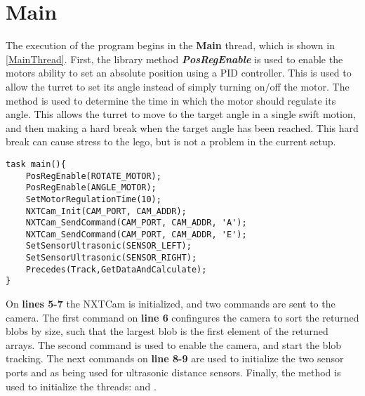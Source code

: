 \section{Main}
The execution of the program begins in the \textbf{Main} thread, which is shown
in \autoref{MainThread}. First, the library method
\textbf{\textit{PosRegEnable}} is used to enable the motors ability to set an absolute position using a PID controller. This is used to
allow the turret to set its angle instead of simply turning on/off the motor.
The  method is used to determine the
time in which the motor should regulate its angle. This allows the turret to
move to the target angle in a single swift motion, and then making a hard break
when the target angle has been reached. This hard break can cause stress to the
lego, but is not a problem in the current setup.\nl

\begin{minipage}[H]{\linewidth}
\begin{lstlisting}[caption = Entry point for the program execution., label = MainThread] 
task main(){
    PosRegEnable(ROTATE_MOTOR);
    PosRegEnable(ANGLE_MOTOR);
    SetMotorRegulationTime(10);
    NXTCam_Init(CAM_PORT, CAM_ADDR);
    NXTCam_SendCommand(CAM_PORT, CAM_ADDR, 'A');
    NXTCam_SendCommand(CAM_PORT, CAM_ADDR, 'E');
    SetSensorUltrasonic(SENSOR_LEFT);
    SetSensorUltrasonic(SENSOR_RIGHT);
    Precedes(Track,GetDataAndCalculate);
}
\end{lstlisting}
\end{minipage}

On \textbf{lines 5-7} the NXTCam is initialized, and two commands are
sent to the camera. The first command on \textbf{line 6} confingures the camera
to sort the returned blobs by size, such that the largest blob is the first
element of the returned arrays. The second command is used to enable the camera,
and start the blob tracking. The next commands on \textbf{line 8-9} are used to
initialize the two sensor ports  and
 as being used for ultrasonic distance sensors.
Finally, the  method is used to initialize the
threads:  and .
